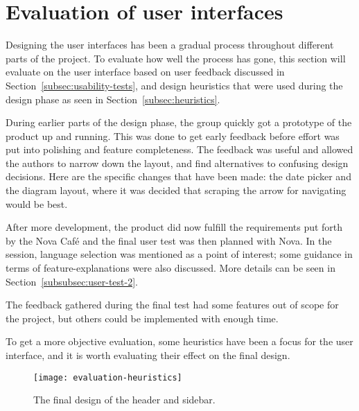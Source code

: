 
\section{Evaluation of user interfaces}\label{sec:evaluation}
Designing the user interfaces has been a gradual process throughout different
parts of the project.
To evaluate how well the process has gone, this section will evaluate on the
user interface based on user feedback discussed in Section~\ref{subsec:usability-tests},
and design heuristics that were used during the design phase as seen in Section~\ref{subsec:heuristics}.

During earlier parts of the design phase, the group quickly got a prototype of
the product up and running.
This was done to get early feedback before effort was put into polishing and
feature completeness.
The feedback was useful and allowed the authors to narrow down the layout,
and find alternatives to confusing design decisions.
Here are the specific changes that have been made: the date picker and the
diagram layout, where it was decided that scraping the arrow for navigating
would be best.

After more development, the product did now fulfill the requirements put forth
by the Nova Café and the final user test was then planned with Nova.
In the session, language selection was mentioned as a point of interest; some
guidance in terms of feature-explanations were also discussed.
More details can be seen in Section~\ref{subsubsec:user-test-2}.

The feedback gathered during the final test had some features out of
scope for the project, but others could be implemented with enough time.

To get a more objective evaluation, some heuristics have been a focus for
the user interface, and it is worth evaluating their effect on the final design.

\begin{figure}
    \centering
    \texttt{[image: evaluation-heuristics]}
    \caption{The final design of the header and sidebar.
    }\label{fig:evaluation-heuristics}
\end{figure}

